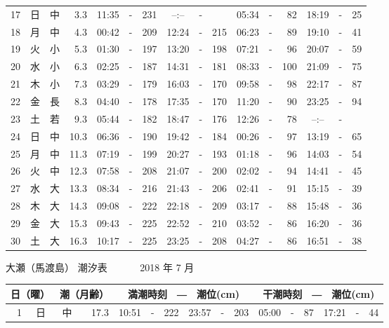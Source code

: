 \documentclass[12pt.a4j]{jsarticle}
\begin{document}
\begin{center}
\begin{table}[ht]
\begin{tabular}{|rc|cr|ccrccr|ccrccr|}
17 & 日 & 中 &  3.3 &  11:35 &-& 231  &  --:-- &-&     &   05:34 &-&  82  &   18:19 &-&  25  \\
18 & 月 & 中 &  4.3 &  00:42 &-& 209  &  12:24 &-& 215  &   06:23 &-&  89  &   19:10 &-&  41  \\
19 & 火 & 小 &  5.3 &  01:30 &-& 197  &  13:20 &-& 198  &   07:21 &-&  96  &   20:07 &-&  59  \\
20 & 水 & 小 &  6.3 &  02:25 &-& 187  &  14:31 &-& 181  &   08:33 &-& 100  &   21:09 &-&  75  \\
21 & 木 & 小 &  7.3 &  03:29 &-& 179  &  16:03 &-& 170  &   09:58 &-&  98  &   22:17 &-&  87  \\
22 & 金 & 長 &  8.3 &  04:40 &-& 178  &  17:35 &-& 170  &   11:20 &-&  90  &   23:25 &-&  94  \\
23 & 土 & 若 &  9.3 &  05:44 &-& 182  &  18:47 &-& 176  &   12:26 &-&  78  &   --:-- &-&     \\
24 & 日 & 中 & 10.3 &  06:36 &-& 190  &  19:42 &-& 184  &   00:26 &-&  97  &   13:19 &-&  65  \\
25 & 月 & 中 & 11.3 &  07:19 &-& 199  &  20:27 &-& 193  &   01:18 &-&  96  &   14:03 &-&  54  \\
26 & 火 & 中 & 12.3 &  07:58 &-& 208  &  21:07 &-& 200  &   02:02 &-&  94  &   14:41 &-&  45  \\
27 & 水 & 大 & 13.3 &  08:34 &-& 216  &  21:43 &-& 206  &   02:41 &-&  91  &   15:15 &-&  39  \\
28 & 木 & 大 & 14.3 &  09:08 &-& 222  &  22:18 &-& 209  &   03:17 &-&  88  &   15:48 &-&  36  \\
29 & 金 & 大 & 15.3 &  09:43 &-& 225  &  22:52 &-& 210  &   03:52 &-&  86  &   16:20 &-&  36  \\
30 & 土 & 大 & 16.3 &  10:17 &-& 225  &  23:25 &-& 208  &   04:27 &-&  86  &   16:51 &-&  38  \\
   \hline
   \end{tabular}
\end{table}
\newpage
 {\LARGE 大瀬（馬渡島）  潮汐表　　　}
 {\large 2018 年  7 月}\\
 \begin{table}[ht]
    \begin{tabular}{|rc|cr|ccrccr|ccrccr|}
    \hline
    \multicolumn{2}{|c|}{日（曜）} & \multicolumn{2}{c|}{潮（月齢）} & \multicolumn{6}{c|}{満潮時刻　―　潮位(cm)} & \multicolumn{6}{c|}{干潮時刻　―　潮位(cm)} \\
 \hline
 1 & 日 & 中 & 17.3 &  10:51 &-& 222  &  23:57 &-& 203  &   05:00 &-&  87  &   17:21 &-&  44  \\

\end{tabular}
\end{table}
\end{center}
\end{document}
